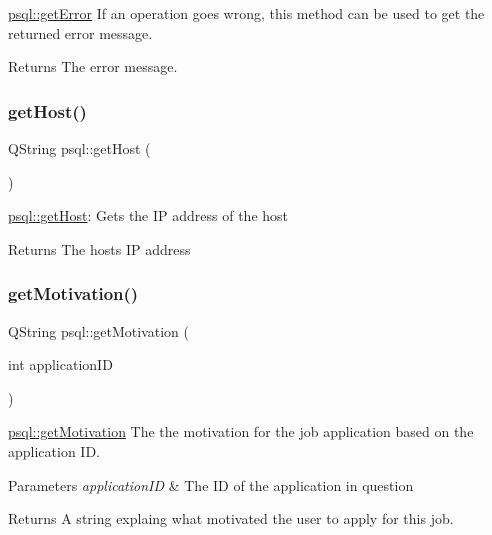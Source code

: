 \mbox{\hyperlink{classpsql_a5f51e254b67ff932f287df2184ccc043}{psql\+::get\+Error}} If an operation goes wrong, this method can be used to get the returned error message. 

\begin{DoxyReturn}{Returns}
The error message. 
\end{DoxyReturn}
\mbox{\label{classpsql_a95d06ee661db0b9cf72605b983b04613}} 
\subsubsection{\texorpdfstring{getHost()}{getHost()}}
{\footnotesize\ttfamily Q\+String psql\+::get\+Host (\begin{DoxyParamCaption}{ }\end{DoxyParamCaption})}



\mbox{\hyperlink{classpsql_a95d06ee661db0b9cf72605b983b04613}{psql\+::get\+Host}}\+: Gets the IP address of the host 

\begin{DoxyReturn}{Returns}
The host\textquotesingle{}s IP address 
\end{DoxyReturn}
\mbox{\label{classpsql_aca1b2273937491e113089c1547caf49b}} 
\subsubsection{\texorpdfstring{getMotivation()}{getMotivation()}}
{\footnotesize\ttfamily Q\+String psql\+::get\+Motivation (\begin{DoxyParamCaption}\item[{int}]{application\+ID }\end{DoxyParamCaption})}



\mbox{\hyperlink{classpsql_aca1b2273937491e113089c1547caf49b}{psql\+::get\+Motivation}} The the motivation for the job application based on the application ID. 


\begin{DoxyParams}{Parameters}
{\em application\+ID} & The ID of the application in question \\
\hline
\end{DoxyParams}
\begin{DoxyReturn}{Returns}
A string explaing what motivated the user to apply for this job. 
\end{DoxyReturn}
\mbox{\label{classpsql_a817e5a88f877cac6f843c1e743aec096}} 
